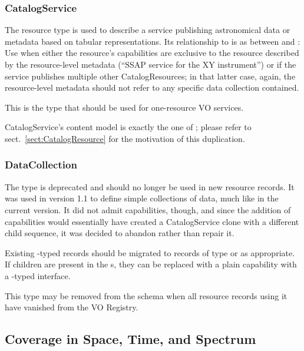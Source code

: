 \documentclass[11pt,a4paper]{ivoa}
\begin{document}


\subsubsection{CatalogService}

The  resource type is used to describe a
service publishing astronomical data or metadata based on tabular
representations.  Its relationship to 
is as between 
and : Use  when either
the resource's capabilities are exclusive to the resource described by
the resource-level metadata (``SSAP service for the XY instrument'') or
if the service publishes multiple other CatalogResources; in that latter
case, again, the resource-level metadata should not refer to any
specific data collection contained.

This is the type that should be used for one-resource VO
services.

CatalogService's content model is exactly the one of
; please refer to sect.~\ref{sect:CatalogResource}
for the motivation of this duplication.

\subsubsection{DataCollection}
\label{sect:datacollection}

The  type is deprecated and should no longer be
used in new resource records.  It was used in version 1.1 to define
simple collections of data, much like  in the
current version.  It did not admit capabilities, though, and since the
addition of capabilities would essentially have created a CatalogService
clone with a different child sequence, it was decided to abandon rather
than repair it.

Existing -typed
records should be migrated to records of type  or
 as appropriate.  If 
children are present in the
\/s,
they can be replaced with a plain capability with a
-typed interface.

This type may be removed from the schema when all resource records using
it have vanished from the VO Registry.


\subsection{Coverage in Space, Time, and Spectrum}
\label{sect:cover}
\end{document}
